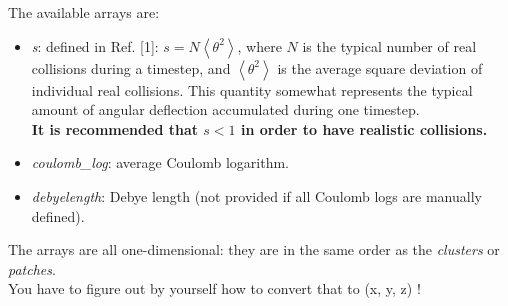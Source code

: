 \documentclass[11pt]{article}
\newcommand{\val}[1]{{\ttfamily \textit{#1}}}
\begin{document}
The available arrays are:
\begin{itemize}
	\item \val{s}: defined in Ref. [1]: $s=N\left<\theta^2\right>$, where $N$ is the typical number of real
	collisions during a timestep, and $\left<\theta^2\right>$ is the average square deviation of individual 
	real collisions. This quantity somewhat represents the typical amount of angular deflection accumulated
	during one timestep.\\ \textbf{It is recommended that $s<1$ in order to have realistic collisions.}
	\item \val{coulomb\_log}: average Coulomb logarithm.
	\item \val{debyelength}: Debye length (not provided if all Coulomb logs are manually defined).
\end{itemize}

The arrays are all one-dimensional: they are in the same order as the \textit{clusters} or \textit{patches}.\\
You have to figure out by yourself how to convert that to (x, y, z) !
\end{document}
